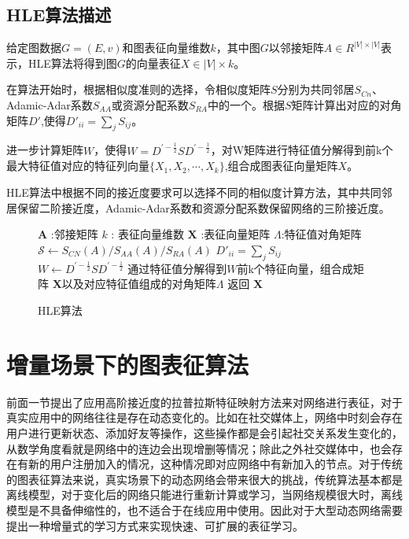 \subsection{HLE算法描述}
	给定图数据$G = (E,v)$和图表征向量维数$k$，其中图$G$以邻接矩阵$A\in R^{|V|\times |V|}$表示，HLE算法将得到图$G$的向量表征$X\in |V|\times k$。
	
	在算法开始时，根据相似度准则的选择，令相似度矩阵$S$分别为共同邻居$S_{Cn}$、Adamic-Adar系数$S_{AA}$或资源分配系数$S_{RA}$中的一个。根据$S$矩阵计算出对应的对角矩阵$D\prime$,使得$D'_{ii} = \sum_j S_{ij}$。

	进一步计算矩阵$W$，使得$W=D^{\prime-\frac{1}{2}}SD^{\prime-\frac{1}{2}}$，对W矩阵进行特征值分解得到前k个最大特征值对应的特征列向量$\{X_1,X_2,\cdots,X_k\}$,组合成图表征向量矩阵$X$。
	
	HLE算法中根据不同的接近度要求可以选择不同的相似度计算方法，其中共同邻居保留二阶接近度，Adamic-Adar系数和资源分配系数保留网络的三阶接近度。


\begin{figure}[htb]
	\centering
	\begin{minipage}{.7\linewidth}
		\begin{algorithm}[H]
			\small
			\caption{HLE算法}
			\begin{algorithmic}[1]
				\Require
				\Statex $\textbf{A}$ :邻接矩阵
				\Statex $k$ : 表征向量维数
				\Ensure
				\Statex $\textbf{X}$ :表征向量矩阵
				\Statex $\Lambda$:特征值对角矩阵
				\Statex
				\State $\mathcal{S} \leftarrow S_{CN}(A) /S_{AA}(A) / S_{RA}(A)$
				\State $D'_{ii} = \sum_j S_{ij}$
				\State $W \leftarrow  D^{\prime-\frac{1}{2}}SD^{\prime-\frac{1}{2}}$
				\State 通过特征值分解得到$W$前k个特征向量，组合成矩阵 $\textbf{X}$以及对应特征值组成的对角矩阵$\Lambda$
				\State 返回 $\textbf{X}$
			\end{algorithmic}
		\end{algorithm}
	\end{minipage}
\end{figure}

\section{增量场景下的图表征算法}
前面一节提出了应用高阶接近度的拉普拉斯特征映射方法来对网络进行表征，对于真实应用中的网络往往是存在动态变化的。比如在社交媒体上，网络中时刻会存在用户进行更新状态、添加好友等操作，这些操作都是会引起社交关系发生变化的，从数学角度看就是网络中的连边会出现增删等情况；除此之外社交媒体中，也会存在有新的用户注册加入的情况，这种情况即对应网络中有新加入的节点。对于传统的图表征算法来说，真实场景下的动态网络会带来很大的挑战，传统算法基本都是离线模型，对于变化后的网络只能进行重新计算或学习，当网络规模很大时，离线模型是不具备伸缩性的，也不适合于在线应用中使用。因此对于大型动态网络需要提出一种增量式的学习方式来实现快速、可扩展的表征学习。

